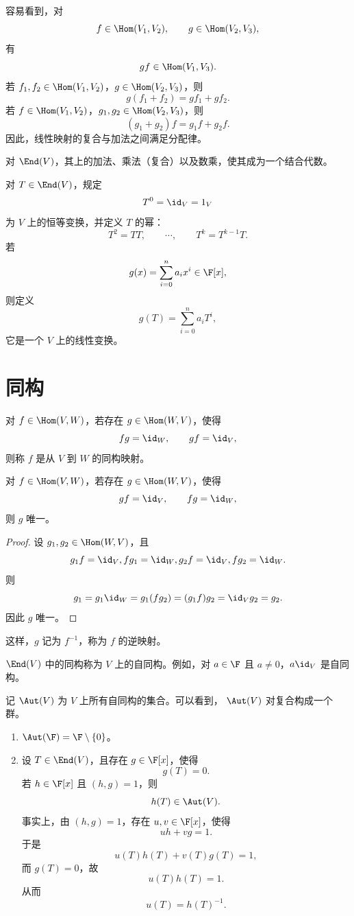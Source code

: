 容易看到，对
\[
f\in\Hom(V_1,V_2),
\qquad
g\in\Hom(V_2,V_3),
\]
有
\[
gf\in\Hom(V_1,V_3).
\]
若 $f_1,f_2\in\Hom(V_1,V_2)$，$g\in\Hom(V_2,V_3)$，则
\[
g(f_1+f_2)=gf_1+gf_2.
\]
若 $f\in\Hom(V_1,V_2)$，$g_1,g_2\in\Hom(V_2,V_3)$，则
\[
(g_1+g_2)f=g_1f+g_2f.
\]
因此，线性映射的复合与加法之间满足分配律。

\begin{proposition}
	对 $\End(V)$，其上的加法、乘法（复合）以及数乘，使其成为一个结合代数。
\end{proposition}

对 $T\in\End(V)$，规定
\[
T^0=\id_V=1_V
\]
为 $V$ 上的恒等变换，并定义 $T$ 的幂：
\[
T^2=TT,
\qquad
\cdots,
\qquad
T^k=T^{k-1}T.
\]
若
\[
g(x)=\sum_{i=0}^{n}a_i x^i\in\F[x],
\]
则定义
\[
g(T)=\sum_{i=0}^{n}a_iT^i,
\]
它是一个 $V$ 上的线性变换。
\section{同构}

\begin{definition}
	对 $f\in\Hom(V,W)$，若存在
	$g\in\Hom(W,V)$，使得
	\[
	fg=\id_{W},
	\qquad
	gf=\id_{V},
	\]
	则称 $f$ 是从 $V$ 到 $W$ 的同构映射。
\end{definition}

\begin{proposition}
	对 $f\in\Hom(V,W)$，若存在
	$g\in\Hom(W,V)$，使得
	\[
	gf=\id_{V},
	\qquad
	fg=\id_{W},
	\]
	则 $g$ 唯一。
\end{proposition}

\begin{proof}
	设 $g_1,g_2\in\Hom(W,V)$，且
	\[
	g_1f=\id_{V}, fg_1=\id_{W},	g_2f=\id_{V}, fg_2=\id_{W}.
	\]
	则
	\[
	g_1
	=g_1\id_{W}
	=g_1(fg_2)
	=(g_1f)g_2
	=\id_{V}g_2
	=g_2.
	\]
	因此 $g$ 唯一。
\end{proof}

这样，$g$ 记为 $f^{-1}$，称为 $f$ 的逆映射。

\begin{definition}
	$\End(V)$ 中的同构称为 $V$ 上的自同构。例如，对
	$a\in\F$ 且 $a\neq 0$，$a\id_{V}$ 是自同构。
	
	记 $\Aut(V)$ 为 $V$ 上所有自同构的集合。可以看到，
	$\Aut(V)$ 对复合构成一个群。
\end{definition}

\begin{example}
	\begin{enumerate}
		\item $\Aut(\F)=\F\setminus\{0\}$。
		\item 设 $T\in\End(V)$，且存在 $g\in\F[x]$，使得
		\[
		g(T)=0.
		\]
		若 $h\in\F[x]$ 且 $(h,g)=1$，则
		\[
		h(T)\in\Aut(V).
		\]
		事实上，由 $(h,g)=1$，存在 $u,v\in\F[x]$，使得
		\[
		uh+vg=1.
		\]
		于是
		\[
		u(T)h(T)+v(T)g(T)=1,
		\]
		而 $g(T)=0$，故
		\[
		u(T)h(T)=1.
		\]
		从而
		\[
		u(T)=h(T)^{-1}.
		\]
	\end{enumerate}
\end{example}

